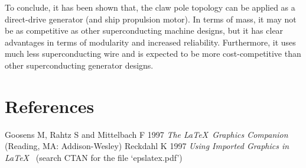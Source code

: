 \documentclass[12pt]{iopart}
\begin{document}
To conclude, it has been shown that, the claw pole topology can be applied as a direct-drive generator (and ship propulsion motor). In terms of mass, it may not be as competitive as other superconducting machine designs, but it has clear advantages in terms of modularity and increased reliability. Furthermore, it uses much less superconducting wire and is expected to be more cost-competitive than other superconducting generator designs.






\section*{References}
\begin{thebibliography}{10}
 Goosens M, Rahtz S and Mittelbach F 1997 {\it The \LaTeX\ Graphics Companion\/} 
(Reading, MA: Addison-Wesley)
 Reckdahl K 1997 {\it Using Imported Graphics in \LaTeX\ } (search CTAN for the file `epslatex.pdf')
\end{thebibliography}
\end{document}
